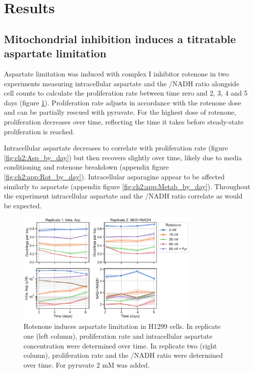 \section{Results}
\subsection{Mitochondrial inhibition induces a titratable aspartate limitation}
Aspartate limitation was induced with complex I inhibitor rotenone in two experiments measuring intracellular aspartate and the \NAD{}/NADH ratio alongside cell counts to calculate the proliferation rate between time zero and 2, 3, 4 and 5 days (figure \ref{fig:ch2:NAD_Asp_time}).
Proliferation rate adjusts in accordance with the rotenone dose and can be partially rescued with pyruvate.
For the highest dose of rotenone, proliferation decreases over time, reflecting the time it takes before steady-state proliferation is reached.

Intracellular aspartate decreases to correlate with proliferation rate (figure \ref{fig:ch2:Asp_by_day}) but then recovers slightly over time, likely due to media conditioning and rotenone breakdown (appendix figure \ref{fig:ch2:app:Rot_by_day}).
Intracellular asparagine appear to be affected similarly to aspartate (appendix figure \ref{fig:ch2:app:Metab_by_day}).
Throughout the experiment intracellular aspartate and the \NAD{}/NADH ratio correlate as would be expected.

\begin{figure}
    \centering
    \includegraphics[width=0.8\textwidth]{figures/chap2/prlfr-asp-NAD-NADH-time_rep1-2.pdf}
    \caption[Aspartate, \NAD{}/NADH ratio over time after rotenone.]{
    Rotenone induces aspartate limitation in H1299 cells.
    In replicate one (left column), proliferation rate and intracellular aspartate concentration were determined over time.
    In replicate two (right column), proliferation rate and the \NAD{}/NADH ratio were determined over time.
    For pyruvate 2 mM was added.
    }
    \label{fig:ch2:NAD_Asp_time}
\end{figure}

